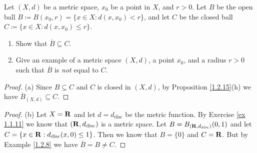 \begin{exercise}\label{ex 1.2.4}
    Let \((X, d)\) be a metric space, \(x_0\) be a point in \(X\), and \(r > 0\).
    Let \(B\) be the open ball \(B \coloneqq B(x_0, r) = \{x \in X : d(x, x_0) < r\}\), and let \(C\) be the closed ball \(C \coloneqq \{x \in X : d(x, x_0) \leq r\}\).
    \begin{enumerate}
        \item Show that \(\overline{B} \subseteq C\).
        \item Give an example of a metric space \((X, d)\), a point \(x_0\), and a radius \(r > 0\) such that \(\overline{B}\) is \emph{not} equal to \(C\).
    \end{enumerate}
\end{exercise}

\begin{proof}{(a)}
    Since \(B \subseteq C\) and \(C\) is closed in \((X, d)\), by Proposition \ref{1.2.15}(h) we have \(\overline{B}_{(X, d)} \subseteq C\).
\end{proof}

\begin{proof}{(b)}
    Let \(X = \mathbf{R}\) and let \(d = d_{\text{disc}}\) be the metric function.
    By Exercise \ref{ex 1.1.11} we know that \((\mathbf{R}, d_{\text{disc}})\) is a metric space.
    Let \(B = B_{(\mathbf{R}, d_{\text{disc}})}(0, 1)\) and let \(C = \{x \in \mathbf{R} : d_{\text{disc}}(x, 0) \leq 1\}\).
    Then we know that \(B = \{0\}\) and \(C = \mathbf{R}\).
    But by Example \ref{1.2.8} we have \(\overline{B} = B \neq C\).
\end{proof}
